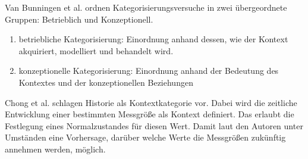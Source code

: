 Van Bunningen et al. \cite{van2005context} ordnen Kategorisierungsversuche in zwei übergeordnete Gruppen: Betrieblich und Konzeptionell. 
\begin{enumerate}
\item{betriebliche Kategorisierung: Einordnung anhand dessen, wie der Kontext akquiriert, modelliert und behandelt wird.}
\item{konzeptionelle Kategorisierung: Einordnung anhand der Bedeutung des Kontextes und der konzeptionellen Beziehungen}
\end{enumerate}
Chong et al. \cite{chong_context-aware_nodate} schlagen Historie als Kontextkategorie vor. Dabei wird die zeitliche Entwicklung einer bestimmten Messgröße als Kontext definiert. Das erlaubt die Festlegung eines Normalzustandes für diesen Wert. Damit laut den Autoren unter Umständen eine Vorhersage, darüber welche Werte die Messgrößen zukünftig annehmen werden, möglich.



